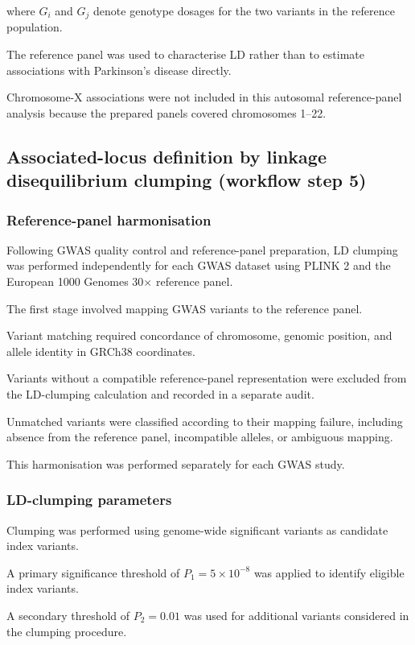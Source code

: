 \documentclass[11pt,a4paper]{article}
\begin{document}
where $G_i$ and $G_j$ denote genotype dosages
for the two variants in the reference population.

The reference panel was used to characterise LD
rather than to estimate associations with
Parkinson's disease directly.

Chromosome-X associations were not included in
this autosomal reference-panel analysis because
the prepared panels covered chromosomes 1--22.


\subsection{Associated-locus definition by linkage disequilibrium clumping (workflow step 5)}
\label{sec:clumping}

\subsubsection{Reference-panel harmonisation}

Following GWAS quality control and reference-panel
preparation, LD clumping was performed independently
for each GWAS dataset using PLINK 2 and the European
1000 Genomes 30$\times$ reference panel.

The first stage involved mapping GWAS variants
to the reference panel.

Variant matching required concordance of chromosome,
genomic position, and allele identity in GRCh38
coordinates.

Variants without a compatible reference-panel
representation were excluded from the LD-clumping
calculation and recorded in a separate audit.

Unmatched variants were classified according
to their mapping failure, including absence
from the reference panel, incompatible alleles,
or ambiguous mapping.

This harmonisation was performed separately for
each GWAS study.

\subsubsection{LD-clumping parameters}

Clumping was performed using genome-wide significant
variants as candidate index variants.

A primary significance threshold of
$P_1 = 5 \times 10^{-8}$ was applied to identify
eligible index variants.

A secondary threshold of $P_2 = 0.01$ was used
for additional variants considered in the
clumping procedure.
\end{document}
